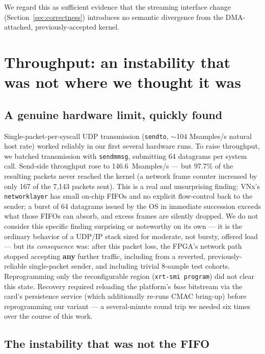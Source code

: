 \documentclass[11pt,a4paper]{article}
\newcommand{\code}[1]{\texttt{#1}}
\begin{document}
We regard this as sufficient evidence that the streaming interface
change (Section~\ref{sec:correctness}) introduces no semantic divergence
from the DMA-attached, previously-accepted kernel.

\section{Throughput: an instability that was not where we thought it was}
\label{sec:throughput}

\subsection{A genuine hardware limit, quickly found}
\label{sec:fifo}

\begin{sloppypar}
Single-packet-per-syscall UDP transmission (\code{sendto}, $\sim$104
Msamples/s natural host rate) worked reliably in our first several
hardware runs. To raise throughput, we batched transmission with
\code{sendmmsg}, submitting 64 datagrams per system call. Send-side
throughput rose to 146.6~Msamples/s --- but 97.7\% of the resulting
packets never reached the kernel (a network frame counter increased by
only 167 of the 7{,}143 packets sent). This is a real and unsurprising
finding: VNx's \code{networklayer} has small on-chip FIFOs and no
explicit flow-control back to the sender; a burst of 64 datagrams issued
by the OS in immediate succession exceeds what those FIFOs can absorb,
and excess frames are silently dropped. We do not consider this specific
finding surprising or noteworthy on its own --- it is the ordinary
behavior of a UDP/IP stack sized for moderate, not bursty, offered load
--- but its \emph{consequence} was: after this packet loss, the FPGA's
network path stopped accepting \textbf{any} further traffic, including
from a reverted, previously-reliable single-packet sender, and including
trivial 8-sample test cohorts. Reprogramming only the reconfigurable
region (\code{xrt-smi program}) did not clear this state. Recovery
required reloading the platform's \emph{base} bitstream via the card's
persistence service (which additionally re-runs CMAC bring-up) before
reprogramming our variant --- a several-minute round trip we needed six
times over the course of this work.
\end{sloppypar}

\subsection{The instability that was not the FIFO}
\end{document}
